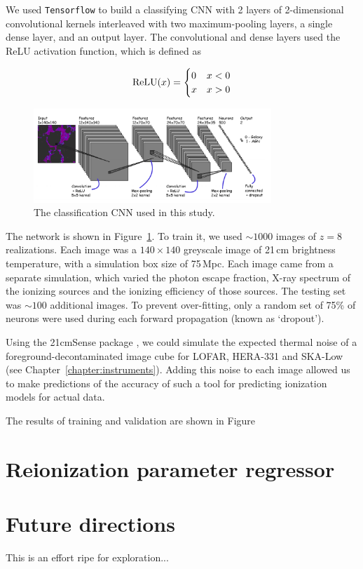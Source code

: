 We used {\tt Tensorflow} to build a classifying CNN with 2 layers of 2-dimensional convolutional kernels interleaved with two maximum-pooling layers, a single dense layer, and an output layer. The convolutional and dense layers used the ReLU activation function, which is defined as

\begin{equation}
{\rm ReLU}(x) = 
\begin{cases} 
      0 & x < 0 \\
      x & x >0 
\end{cases}
\end{equation}

\begin{figure}
\centering
\includegraphics[width=0.8\textwidth]{chapters/hera_ml/figures/hassan-cnn.png}
\caption{The classification CNN used in this study.}
\label{fig:hassan-cnn}
\end{figure}

The network is shown in Figure~\ref{fig:hassan-cnn}. To train it, we used $\sim 1000$ images of $z=8$ realizations. Each image was a $140\times140$ greyscale image of 21\,cm brightness temperature, with a simulation box size of 75\,Mpc. Each image came from a separate simulation, which varied the photon escape fraction, X-ray spectrum of the ionizing sources and the ionizing efficiency of those sources. The testing set was $\sim 100$ additional images. To prevent over-fitting, only a random set of 75\% of neurons were used during each forward propagation (known as `dropout').

Using the {\sc 21cmSense} package \citep{Pober.14}, we could simulate the expected thermal noise of a foreground-decontaminated image cube for LOFAR, HERA-331 and SKA-Low (see Chapter~\ref{chapter:instruments}). Adding this noise to each image allowed us to make predictions of the accuracy of such a tool for predicting ionization models for actual data.

The results of training and validation are shown in Figure

\section{Reionization parameter regressor}

\section{Future directions}
This is an effort ripe for exploration...
%
